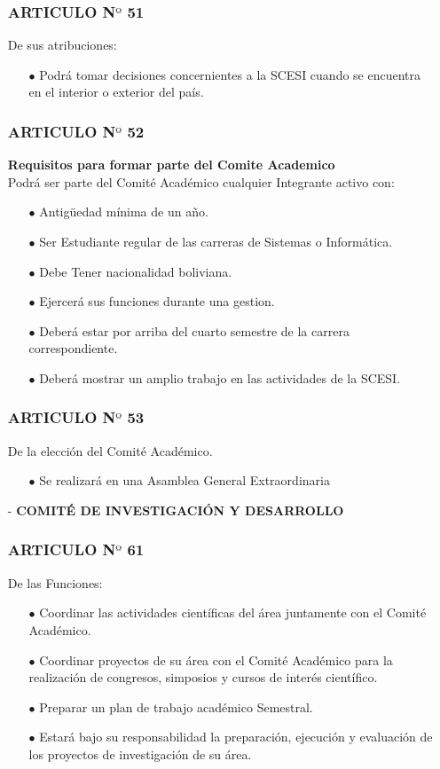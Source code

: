 \documentclass[letterpaper,11pt]{book}
\begin{document}
\begin{itemize}
\subsubsection*{ARTICULO N$º$ 51}
De sus atribuciones:
\begin{itemize}
\item[$\bullet$] Podrá tomar decisiones concernientes a la SCESI cuando se encuentra en el interior o exterior del país. 
\end{itemize}

\subsubsection*{ARTICULO N$º$ 52}
{\bf Requisitos para formar parte del Comite Academico }\\
Podrá ser parte del Comité Académico cualquier Integrante activo con:
\begin{itemize}
\item[$\bullet$] Antigüedad mínima de un año. 
\item[$\bullet$] Ser Estudiante regular de las carreras de Sistemas o Informática.  
\item[$\bullet$] Debe Tener nacionalidad boliviana. 
\item[$\bullet$] Ejercerá sus funciones durante una gestion. 
\item[$\bullet$] Deberá estar por arriba del cuarto semestre de la carrera correspondiente. 
\item[$\bullet$] Deberá mostrar un amplio trabajo en las actividades de la SCESI. 
\end{itemize}
\subsubsection*{ARTICULO N$º$ 53}
De la elección del Comité Académico. 
\begin{itemize}
\item[$\bullet$] Se realizará en una Asamblea General Extraordinaria
\end{itemize}

\item[-] {\bf COMITÉ DE INVESTIGACIÓN Y DESARROLLO}
\subsubsection*{ARTICULO N$º$ 61}
De las Funciones:
\begin{itemize}
\item[$\bullet$] Coordinar las actividades científicas del área juntamente con el Comité Académico. 
\item[$\bullet$] Coordinar proyectos de su área con el Comité Académico para la realización de congresos, simposios y cursos de interés científico. 
\item[$\bullet$] Preparar un plan de trabajo académico Semestral. 
\item[$\bullet$] Estará bajo su responsabilidad la preparación, ejecución y evaluación de los proyectos de investigación de su área. 
\end{itemize}

\end{itemize}
\end{document}
